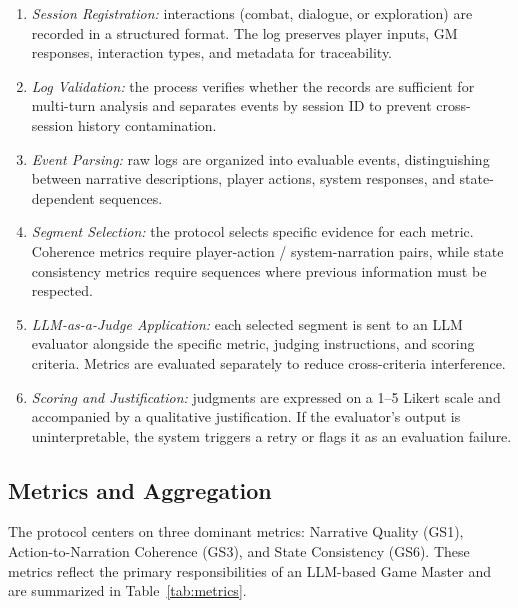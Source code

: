 \documentclass[12pt]{article}
\begin{document}
\begin{enumerate}[leftmargin=2.4em,itemsep=2pt]
  \item \textit{Session Registration:} interactions (combat, dialogue, or exploration) are recorded in a structured format. The log preserves player inputs, GM responses, interaction types, and metadata for traceability.
  \item \textit{Log Validation:} the process verifies whether the records are sufficient for multi-turn analysis and separates events by session ID to prevent cross-session history contamination.
  \item \textit{Event Parsing:} raw logs are organized into evaluable events, distinguishing between narrative descriptions, player actions, system responses, and state-dependent sequences.
  \item \textit{Segment Selection:} the protocol selects specific evidence for each metric. Coherence metrics require player-action / system-narration pairs, while state consistency metrics require sequences where previous information must be respected.
  \item \textit{LLM-as-a-Judge Application:} each selected segment is sent to an LLM evaluator alongside the specific metric, judging instructions, and scoring criteria. Metrics are evaluated separately to reduce cross-criteria interference.
  \item \textit{Scoring and Justification:} judgments are expressed on a 1--5 Likert scale and accompanied by a qualitative justification. If the evaluator's output is uninterpretable, the system triggers a retry or flags it as an evaluation failure.
\end{enumerate}

\subsection{Metrics and Aggregation}
\label{sec:metrics}

The protocol centers on three dominant metrics: Narrative Quality (GS1), Action-to-Narration Coherence (GS3), and State Consistency (GS6). These metrics reflect the primary responsibilities of an LLM-based Game Master and are summarized in Table~\ref{tab:metrics}.
\end{document}
